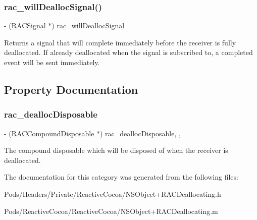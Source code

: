 \subsubsection{\texorpdfstring{rac\+\_\+will\+Dealloc\+Signal()}{rac\_willDeallocSignal()}\hspace{0.1cm}{\footnotesize\ttfamily [3/3]}}
{\footnotesize\ttfamily -\/ (\mbox{\hyperlink{interface_r_a_c_signal}{R\+A\+C\+Signal}} $\ast$) rac\+\_\+will\+Dealloc\+Signal \begin{DoxyParamCaption}{ }\end{DoxyParamCaption}}

Returns a signal that will complete immediately before the receiver is fully deallocated. If already deallocated when the signal is subscribed to, a {\ttfamily completed} event will be sent immediately. 

\subsection{Property Documentation}
\mbox{\label{category_n_s_object_07_r_a_c_deallocating_08_a6efe072a0bebe068cf03293fcec2f920}} 
\subsubsection{\texorpdfstring{rac\+\_\+dealloc\+Disposable}{rac\_deallocDisposable}}
{\footnotesize\ttfamily -\/ (\mbox{\hyperlink{interface_r_a_c_compound_disposable}{R\+A\+C\+Compound\+Disposable}} $\ast$) rac\+\_\+dealloc\+Disposable\hspace{0.3cm}{\ttfamily [read]}, {\ttfamily [atomic]}, {\ttfamily [strong]}}

The compound disposable which will be disposed of when the receiver is deallocated. 

The documentation for this category was generated from the following files\+:\begin{DoxyCompactItemize}
\item 
Pods/\+Headers/\+Private/\+Reactive\+Cocoa/N\+S\+Object+\+R\+A\+C\+Deallocating.\+h\item 
Pods/\+Reactive\+Cocoa/\+Reactive\+Cocoa/N\+S\+Object+\+R\+A\+C\+Deallocating.\+m\end{DoxyCompactItemize}

